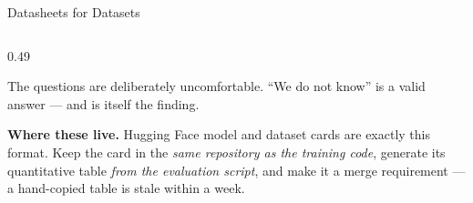 \begin{frame}[allowframebreaks]{Datasheets for Datasets}
\begin{columns}[T]
\begin{column}{0.49\textwidth}
            \vspace{0.15em}
            \begin{tcolorbox}[colback=raiAmber!5, colframe=raiAmber!70, boxrule=0.6pt]
                \scriptsize The questions are deliberately uncomfortable. ``We do not know'' is a
                valid answer --- and is itself the finding.
            \end{tcolorbox}

            \vspace{0.12em}
            \begin{tcolorbox}[colback=raiGreen!5, colframe=raiGreen!60, boxrule=0.6pt]
                \scriptsize \textbf{Where these live.} Hugging Face model and dataset cards are
                exactly this format. Keep the card in the \emph{same repository as the training
                code}, generate its quantitative table \emph{from the evaluation script}, and make
                it a merge requirement --- a hand-copied table is stale within a week.
            \end{tcolorbox}
        \end{column}
    \end{columns}
\end{frame}

